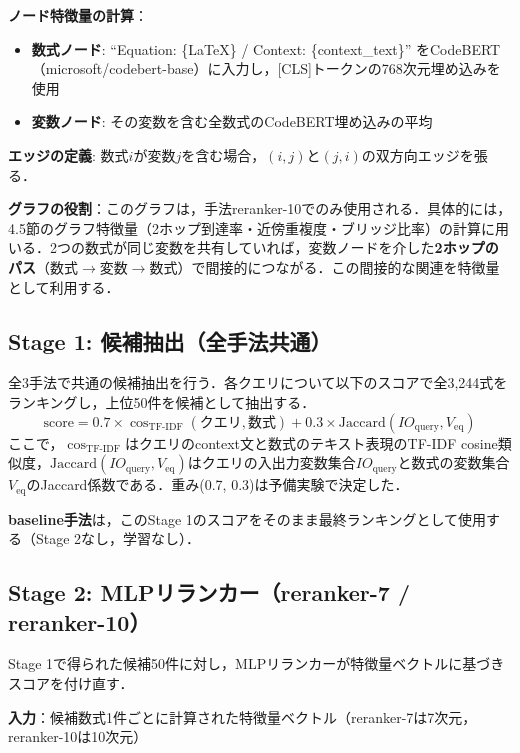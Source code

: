 \documentclass[11pt,a4paper]{ltjsarticle}
\begin{document}
\textbf{ノード特徴量の計算}：
\begin{itemize}[nosep]
  \item \textbf{数式ノード}: ``Equation: \{LaTeX\} / Context: \{context\_text\}'' をCodeBERT（microsoft/codebert-base）に入力し，[CLS]トークンの768次元埋め込みを使用
  \item \textbf{変数ノード}: その変数を含む全数式のCodeBERT埋め込みの平均
\end{itemize}

\textbf{エッジの定義}: 数式$i$が変数$j$を含む場合，$(i,j)$と$(j,i)$の双方向エッジを張る．

\textbf{グラフの役割}：このグラフは，手法reranker-10でのみ使用される．具体的には，4.5節のグラフ特徴量（2ホップ到達率・近傍重複度・ブリッジ比率）の計算に用いる．2つの数式が同じ変数を共有していれば，変数ノードを介した\textbf{2ホップのパス}（数式$\to$変数$\to$数式）で間接的につながる．この間接的な関連を特徴量として利用する．

\subsection{Stage 1: 候補抽出（全手法共通）}

全3手法で共通の候補抽出を行う．各クエリについて以下のスコアで全3,244式をランキングし，上位50件を候補として抽出する．
\begin{equation}
  \mathrm{score} = 0.7 \times \cos_{\mathrm{TF\text{-}IDF}}(\text{クエリ}, \text{数式}) + 0.3 \times \mathrm{Jaccard}(\mathit{IO}_{\mathrm{query}}, V_{\mathrm{eq}})
\end{equation}
ここで，$\cos_{\mathrm{TF\text{-}IDF}}$はクエリのcontext文と数式のテキスト表現のTF-IDF cosine類似度，$\mathrm{Jaccard}(\mathit{IO}_{\mathrm{query}}, V_{\mathrm{eq}})$はクエリの入出力変数集合$\mathit{IO}_{\mathrm{query}}$と数式の変数集合$V_{\mathrm{eq}}$のJaccard係数である．重み(0.7, 0.3)は予備実験で決定した．

\textbf{baseline手法}は，このStage 1のスコアをそのまま最終ランキングとして使用する（Stage 2なし，学習なし）．

\subsection{Stage 2: MLPリランカー（reranker-7 / reranker-10）}

Stage 1で得られた候補50件に対し，MLPリランカーが特徴量ベクトルに基づきスコアを付け直す．

\textbf{入力}：候補数式1件ごとに計算された特徴量ベクトル（reranker-7は7次元，reranker-10は10次元）
\end{document}
